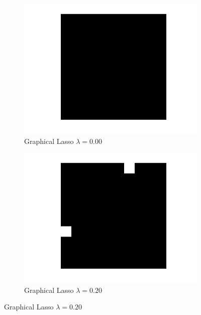 \documentclass{article}
\begin{document}
\begin{enumerate}
\begin{figure}[ht!]
\end{figure}

\begin{figure}[ht!]
\centering
\begin{subfigure}{.5\textwidth}
  \centering
  \includegraphics[width=.8\linewidth]{glasso_0_00.png}
  \caption{Graphical Lasso $\lambda=0.00$}
\end{subfigure}%
\begin{subfigure}{.5\textwidth}
  \centering
  \includegraphics[width=.8\linewidth]{glasso_0_20.png}
  \caption{Graphical Lasso $\lambda=0.20$}
\end{subfigure}


\end{figure}
\end{enumerate}
\end{document}
